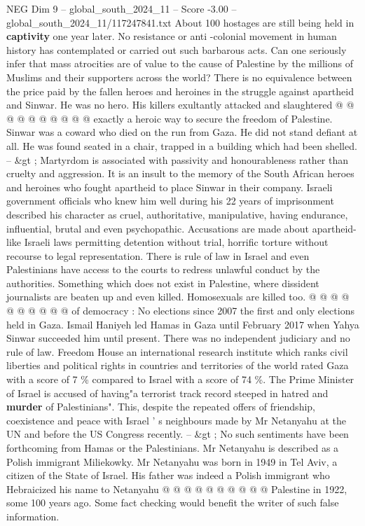 \begin{textsample}{NEG Dim 9 – global\_south\_2024\_11 – Score -3.00 – global\_south\_2024\_11/117247841.txt}
About 100 hostages are still being held in \textbf{captivity} one year later.
No resistance or anti -colonial movement in human history has contemplated or carried out such barbarous acts.
Can one seriously infer that mass atrocities are of value to the cause of Palestine by the millions of Muslims and their supporters across the world?
There is no equivalence between the price paid by the fallen heroes and heroines in the struggle against apartheid and Sinwar.
He was no hero.
His killers exultantly attacked and slaughtered @ @ @ @ @ @ @ @ @ @ exactly a heroic way to secure the freedom of Palestine.
Sinwar was a coward who died on the run from Gaza.
He did not stand defiant at all.
He was found seated in a chair, trapped in a building which had been shelled. -- \&gt ; Martyrdom is associated with passivity and honourableness rather than cruelty and aggression.
It is an insult to the memory of the South African heroes and heroines who fought apartheid to place Sinwar in their company.
Israeli government officials who knew him well during his 22 years of imprisonment described his character as cruel, authoritative, manipulative, having endurance, influential, brutal and even psychopathic.
Accusations are made about apartheid-like Israeli laws permitting detention without trial, horrific torture without recourse to legal representation.
There is rule of law in Israel and even Palestinians have access to the courts to redress unlawful conduct by the authorities.
Something which does not exist in Palestine, where dissident journalists are beaten up and even killed.
Homosexuals are killed too. @ @ @ @ @ @ @ @ @ @ of democracy : No elections since 2007 the first and only elections held in Gaza.
Ismail Haniyeh led Hamas in Gaza until February 2017 when Yahya Sinwar succeeded him until present.
There was no independent judiciary and no rule of law.
Freedom House an international research institute which ranks civil liberties and political rights in countries and territories of the world rated Gaza with a score of 7 \% compared to Israel with a score of 74 \%.
The Prime Minister of Israel is accused of having"a terrorist track record steeped in hatred and \textbf{murder} of Palestinians".
This, despite the repeated offers of friendship, coexistence and peace with Israel ' s neighbours made by Mr Netanyahu at the UN and before the US Congress recently. -- \&gt ; No such sentiments have been forthcoming from Hamas or the Palestinians.
Mr Netanyahu is described as a Polish immigrant Miliekowky.
Mr Netanyahu was born in 1949 in Tel Aviv, a citizen of the State of Israel.
His father was indeed a Polish immigrant who Hebraicized his name to Netanyahu @ @ @ @ @ @ @ @ @ @ Palestine in 1922, some 100 years ago.
Some fact checking would benefit the writer of such false information.

\end{textsample}
